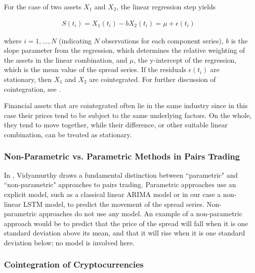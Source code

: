 \documentclass{article}
\begin{document}
\noindent For the case of two assets $X_{1}$ and $X_{2}$, the linear regression step yields 

\begin{align}
S(t_{i}) = X_{1}(t_{i}) - b X_{2}(t_{i}) = \mu + \epsilon(t_{i})
\end{align}

\noindent where $i = 1, ..., N$ (indicating $N$ observations for each component series), $b$ is the slope parameter from the regression, which determines the relative weighting of the assets in the linear combination, and $\mu$, the y-intercept of the regression, which is the mean value of the spread series. If the residuals $\epsilon(t_{i})$ are stationary, then $X_{1}$ and $X_{2}$ are cointegrated. For further discussion of cointegration, see \cite{vidyamurthy2004pairs}. 

Financial assets that are cointegrated often lie in the same industry since in this case their prices tend to be subject to the same underlying factors. On the whole, they tend to move together, while their difference, or other suitable linear combination, can be treated as stationary. 



\subsubsection{Non-Parametric vs. Parametric Methods in Pairs Trading}

In \cite{vidyamurthy2004pairs}, Vidyamurthy draws a fundamental distinction between ``parametric" and ``non-parametric" approaches to pairs trading. Parametric approaches use an explicit model, such as a classical linear ARIMA model or in our case a non-linear LSTM model, to predict the movement of the spread series. Non-parametric approaches do not use any model. An example of a non-parametric approach would be to predict that the price of the spread will fall when it is one standard deviation above its mean, and that it will rise when it is one standard deviation below; no model is involved here. 

\subsubsection{Cointegration of Cryptocurrencies}
\end{document}
